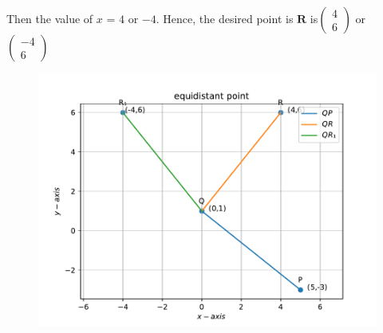 \documentclass[12pt]{article}
\newcommand{\myvec}[1]{\ensuremath{\begin{pmatrix}#1\end{pmatrix}}}
\let\vec\mathbf
\begin{document}
\begin{enumerate}
Then the value of $x$ = $ 4$ or $-4$.
Hence, the desired point is $\vec{R}$ is$\myvec{ 4 \\ 6}$ or $\myvec{-4\\6}$

\begin{figure}[!h]
 \begin{center}
  \includegraphics[width=\columnwidth]{figs/fig.pdf}
 \end{center}
\caption{}
\label{fig:Fig1}
\end{figure}



\end{enumerate}
\end{document}
